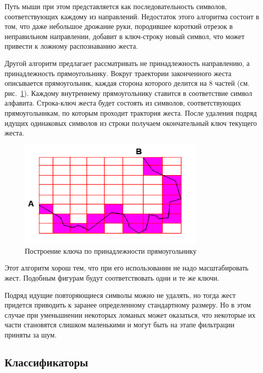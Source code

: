 \documentclass[a5paper]{article}
\begin{document}
Путь мыши при этом представляется как последовательность символов, соответствующих каждому из направлений. Недостаток этого алгоритма состоит 
в том, что даже небольшое дрожание руки, породившее короткий отрезок в неправильном направлении, добавит в ключ-строку новый символ, что
может привести к ложному распознаванию жеста.

Другой алгоритм предлагает рассматривать не принадлежность направлению, а принадлежность прямоугольнику. Вокруг траектории законченного жеста 
описывается прямоугольник, каждая сторона которого делится на 8 частей (см. рис.~\ref{squares}). Каждому внутреннему 
прямоугольнику ставится в соответствие символ алфавита. Строка-ключ жеста будет состоять из символов, соответствующих прямоугольникам, по
которым проходит трактория жеста. После удаления подряд идущих одинаковых символов из строки получаем окончательный ключ текущего жеста. 

\begin{figure} [ht]
  \begin{center}
    \includegraphics[width=0.8\textwidth, bb=0 0 544 390]{03-squares.png}
    \caption{Построение ключа по принадлежности прямоугольнику}
    \label{squares}
  \end{center}
\end{figure}

Этот алгоритм хорош тем, что при его использовании не надо масштабировать жест. Подобным фигурам будут соответствовать одни и те же ключи.

Подряд идущие повторяющиеся символы можно не удалять, но тогда жест придется приводить к заранее определенному стандартному размеру. 
Но в этом случае при уменьшнении некоторых ломаных может оказаться, что некоторые их части становятся слишком маленькими и
могут быть на этапе фильтрации приняты за шум.


\subsection{Классификаторы}
\end{document}
